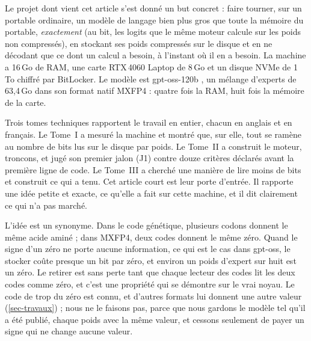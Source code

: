 \documentclass[11pt, a4paper]{article}
\theoremstyle{remark}
\begin{document}
Le projet dont vient cet article s'est donné un but concret : faire tourner, sur un portable ordinaire, un modèle de langage bien plus gros que toute la mémoire du portable, \emph{exactement} (au bit, les logits que le même moteur calcule sur les poids non compressés), en stockant ses poids compressés sur le disque et en ne décodant que ce dont un calcul a besoin, à l'instant où il en a besoin. La machine a 16\,Go de RAM, une carte RTX\,4060 Laptop de 8\,Go et un disque NVMe de 1\,To chiffré par BitLocker. Le modèle est gpt-oss-120b \citep{openai2025gptoss}, un mélange d'experts de 63,4\,Go dans son format natif MXFP4 : quatre fois la RAM, huit fois la mémoire de la carte.

Trois tomes techniques rapportent le travail en entier, chacun en anglais et en français. Le Tome~I \citep{troncons-tome1} a mesuré la machine et montré que, sur elle, tout se ramène au nombre de bits lus sur le disque par poids. Le Tome~II \citep{troncons-tome2} a construit le moteur, troncons, et jugé son premier jalon (J1) contre douze critères déclarés avant la première ligne de code. Le Tome~III \citep{troncons-tome3} a cherché une manière de lire moins de bits et construit ce qui a tenu. Cet article court est leur porte d'entrée. Il rapporte une idée petite et exacte, ce qu'elle a fait sur cette machine, et il dit clairement ce qui n'a pas marché.

L'idée est un synonyme. Dans le code génétique, plusieurs codons donnent le même acide aminé \citep{crick1968} ; dans MXFP4, deux codes donnent le même zéro. Quand le signe d'un zéro ne porte aucune information, ce qui est le cas dans gpt-oss, le stocker coûte presque un bit par zéro, et environ un poids d'expert sur huit est un zéro. Le retirer est sans perte tant que chaque lecteur des codes lit les deux codes comme zéro, et c'est une propriété qui se démontre sur le vrai noyau. Le code de trop du zéro est connu, et d'autres formats lui donnent une autre valeur (\cref{sec-travaux}) ; nous ne le faisons pas, parce que nous gardons le modèle tel qu'il a été publié, chaque poids avec la même valeur, et cessons seulement de payer un signe qui ne change aucune valeur.
\end{document}
